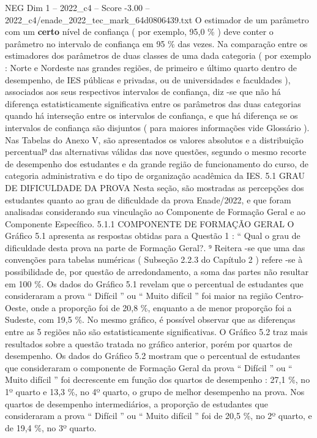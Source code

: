 \begin{textsample}{NEG Dim 1 – 2022\_c4 – Score -3.00 – 2022\_c4/enade\_2022\_tec\_mark\_64d0806439.txt}
O estimador de um parâmetro com um \textbf{certo} nível de confiança ( por exemplo, 95,0 \% ) deve conter o parâmetro no intervalo de confiança em 95 \% das vezes.
Na comparação entre os estimadores dos parâmetros de duas classes de uma dada categoria ( por exemplo : Norte e Nordeste nas grandes regiões, de primeiro e último quarto dentro de desempenho, de IES públicas e privadas, ou de universidades e faculdades ), associados aos seus respectivos intervalos de confiança, diz -se que não há diferença estatisticamente significativa entre os parâmetros das duas categorias quando há interseção entre os intervalos de confiança, e que há diferença se os intervalos de confiança são disjuntos ( para maiores informações vide Glossário ).
Nas Tabelas do Anexo V, são apresentados os valores absolutos e a distribuição percentual⁹ das alternativas válidas das nove questões, segundo o mesmo recorte de desempenho dos estudantes e da grande região de funcionamento do curso, de categoria administrativa e do tipo de organização acadêmica da IES. 5.1 GRAU DE DIFICULDADE DA PROVA Nesta seção, são mostradas as percepções dos estudantes quanto ao grau de dificuldade da prova Enade/2022, e que foram analisadas considerando sua vinculação ao Componente de Formação Geral e ao Componente Específico. 5.1.1 COMPONENTE DE FORMAÇÃO GERAL O Gráfico 5.1 apresenta as respostas obtidas para a Questão 1 : “ Qual o grau de dificuldade desta prova na parte de Formação Geral?. ⁹ Reitera -se que uma das convenções para tabelas numéricas ( Subseção 2.2.3 do Capítulo 2 ) refere -se à possibilidade de, por questão de arredondamento, a soma das partes não resultar em 100 \%.
Os dados do Gráfico 5.1 revelam que o percentual de estudantes que consideraram a prova “ Difícil ” ou “ Muito difícil ” foi maior na região Centro-Oeste, onde a proporção foi de 20,8 \%, enquanto a de menor proporção foi a Sudeste, com 19,5 \%.
No mesmo gráfico, é possível observar que as diferenças entre as 5 regiões não são estatisticamente significativas.
O Gráfico 5.2 traz mais resultados sobre a questão tratada no gráfico anterior, porém por quartos de desempenho.
Os dados do Gráfico 5.2 mostram que o percentual de estudantes que consideraram o componente de Formação Geral da prova “ Difícil ” ou “ Muito difícil ” foi decrescente em função dos quartos de desempenho : 27,1 \%, no 1º quarto e 13,3 \%, no 4º quarto, o grupo de melhor desempenho na prova.
Nos quartos de desempenho intermediários, a proporção de estudantes que consideraram a prova “ Difícil ” ou “ Muito difícil ” foi de 20,5 \%, no 2º quarto, e de 19,4 \%, no 3º quarto.

\end{textsample}
